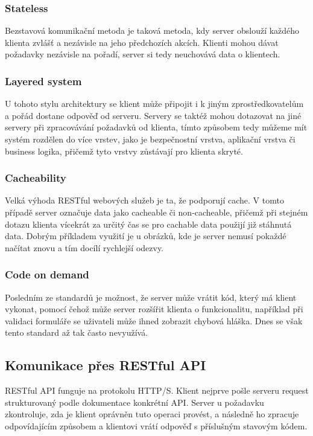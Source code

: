 \subsubsection*{Stateless}
Bezstavová komunikační metoda je taková metoda, kdy server obslouží každého klienta zvlášť a nezávisle na jeho předchozích akcích. Klienti mohou dávat požadavky nezávisle na pořadí, server si tedy neuchovává data o klientech.

\subsubsection*{Layered system}
U tohoto stylu architektury se klient může připojit i k jiným zprostředkovatelům a pořád dostane odpověď od serveru. Servery se taktéž mohou dotazovat na jiné servery při zpracovávání požadavků od klienta, tímto způsobem tedy můžeme mít systém rozdělen do více vrstev, jako je bezpečnostní vrstva, aplikační vrstva či business logika, přičemž tyto vrstvy zůstávají pro klienta skryté.

\subsubsection*{Cacheability}
Velká výhoda RESTful webových služeb je ta, že podporují cache. V tomto případě server označuje data jako cacheable či non-cacheable, přičemž při stejném dotazu klienta vícekrát za určitý čas se pro cachable data použijí již stáhnutá data. Dobrým příkladem využití je u obrázků, kde je server nemusí pokaždé načítat znovu a tím docílí rychlejší odezvy.

\subsubsection*{Code on demand}
Posledním ze standardů je možnost, že server může vrátit kód, který má klient vykonat, pomocí čehož může server rozšířit klienta o funkcionalitu, například při validaci formuláře se uživateli může ihned zobrazit chybová hláška. Dnes se však tento standard až tak často nevyužívá.


\subsection{Komunikace přes RESTful API} %
RESTful API funguje na protokolu HTTP/S. Klient nejprve pošle serveru request strukturovaný podle dokumentace konkrétní API. Server u požadavku zkontroluje, zda je klient oprávněn tuto operaci provést, a následně ho zpracuje odpovídajícím způsobem a klientovi vrátí odpověď s příslušným stavovým kódem.

